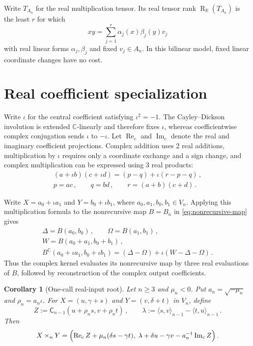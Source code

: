 \documentclass[11pt,reqno]{amsart}
\numberwithin{equation}{section}
\newtheorem{corollary}[proposition]{Corollary}
\newcommand{\R}{\mathbb R}
\newcommand{\C}{\mathbb C}
\newcommand{\Rk}{\operatorname{R}}
\newcommand{\ReC}{\operatorname{Re}_{\mathrm c}}
\newcommand{\ImC}{\operatorname{Im}_{\mathrm c}}
\newcommand{\AltC}{\mathsf C}
\begin{document}
Write $T_{A_n}$ for the real multiplication tensor. Its real tensor rank
$\Rk_{\R}(T_{A_n})$ is the least $r$ for which
\[
xy=\sum_{j=1}^r\alpha_j(x)\beta_j(y)v_j
\]
with real linear forms $\alpha_j,\beta_j$ and fixed $v_j\in A_n$.
In this bilinear model, fixed linear coordinate changes have no cost.


\section{Real coefficient specialization}
\label{subsec:real-specialization}

Write $\iota$
for the central coefficient satisfying $\iota^2=-1$. The Cayley--Dickson
involution is
extended $\C$-linearly and therefore fixes $\iota$, whereas coefficientwise
complex conjugation sends $\iota$ to $-\iota$. Let $\ReC$ and $\ImC$ denote
the real and imaginary coefficient projections. Complex addition uses $2$
real additions, multiplication by $\iota$ requires only a coordinate exchange
and a sign change, and complex multiplication can be expressed using $3$ real
products:
\begin{equation}\label{eq:three-real-complex}
\begin{gathered}
(a+\iota b)(c+\iota d)=(p-q)+\iota(r-p-q)\,,\\
p=ac\,,\qquad q=bd\,,\qquad r=(a+b)(c+d)\,.
\end{gathered}
\end{equation}

Write $X=a_0+\iota a_1$ and $Y=b_0+\iota b_1$, where
$a_0,a_1,b_0,b_1\in V_n$. Applying this multiplication formula to the
nonrecursive map $B=B_n$ in \eqref{eq:nonrecursive-map} gives
\begin{equation}\label{eq:complex-fusion}
\begin{gathered}
\Delta=B(a_0,b_0)\,,\qquad \Omega=B(a_1,b_1)\,,\\
W=B(a_0+a_1,b_0+b_1)\,,\\
B^{\C}(a_0+\iota a_1,b_0+\iota b_1)
=(\Delta-\Omega)+\iota(W-\Delta-\Omega)\,.
\end{gathered}
\end{equation}
Thus the complex kernel evaluates its nonrecursive map by three real evaluations
of $B$, followed by reconstruction of the complex output coefficients.

\begin{corollary}[One-call real-input root]\label{cor:real-root}
Let $n\ge3$ and $\mu_n<0$. Put
$a_n=\sqrt{-\mu_n}$ and $\rho_n=a_n\iota$. For
$X=(u,\gamma+s)$ and $Y=(v,\delta+t)$ in $V_n$, define
\[
Z:=\AltC_{n-1}(u+\rho_n s,v+\rho_n t)\,,\qquad
\lambda:=\langle s,v\rangle_{n-1}-\langle t,u\rangle_{n-1}\,.
\]
Then
\begin{equation}\label{eq:real-root}
X\times_nY
=\Bigl(\ReC Z+\mu_n(\delta s-\gamma t),\;
\lambda+\delta u-\gamma v-a_n^{-1}\ImC Z\Bigr)\,.
\end{equation}
\end{corollary}
\end{document}
